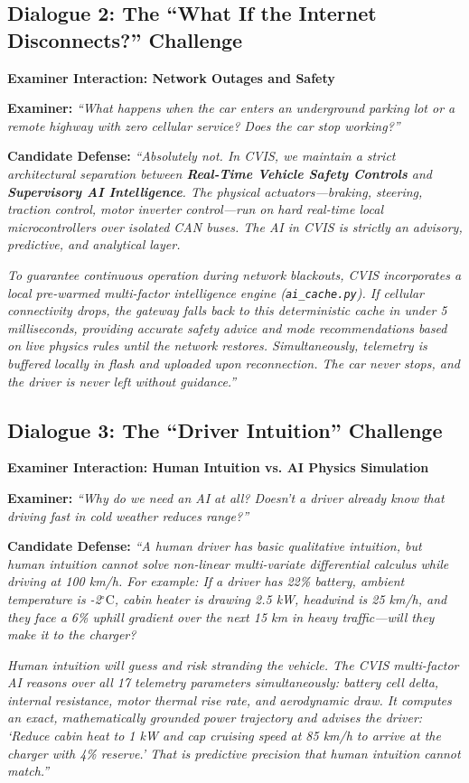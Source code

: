 \documentclass[12pt,a4paper]{report}
\newenvironment{dialoguebox}[1]{%
  \begin{mdframed}[backgroundcolor=cvislightbg,
    linecolor=cvisteal,linewidth=1.5pt,
    innerleftmargin=10pt,innerrightmargin=10pt,
    innertopmargin=6pt,innerbottommargin=6pt]
  \textbf{\color{cvisblue}#1}\par\smallskip}
  {\end{mdframed}}
\begin{document}
\subsection{Dialogue 2: The ``What If the Internet Disconnects?'' Challenge}
\begin{dialoguebox}{Examiner Interaction: Network Outages and Safety}
\textbf{Examiner:} \textit{``What happens when the car enters an underground parking lot or a remote highway with zero cellular service? Does the car stop working?''}

\textbf{Candidate Defense:} 
\textit{``Absolutely not. In CVIS, we maintain a strict architectural separation between \textbf{Real-Time Vehicle Safety Controls} and \textbf{Supervisory AI Intelligence}. The physical actuators---braking, steering, traction control, motor inverter control---run on hard real-time local microcontrollers over isolated CAN buses. The AI in CVIS is strictly an advisory, predictive, and analytical layer.}

\textit{To guarantee continuous operation during network blackouts, CVIS incorporates a local pre-warmed multi-factor intelligence engine (\texttt{ai\_cache.py}). If cellular connectivity drops, the gateway falls back to this deterministic cache in under 5 milliseconds, providing accurate safety advice and mode recommendations based on live physics rules until the network restores. Simultaneously, telemetry is buffered locally in flash and uploaded upon reconnection. The car never stops, and the driver is never left without guidance.''}
\end{dialoguebox}

\subsection{Dialogue 3: The ``Driver Intuition'' Challenge}
\begin{dialoguebox}{Examiner Interaction: Human Intuition vs. AI Physics Simulation}
\textbf{Examiner:} \textit{``Why do we need an AI at all? Doesn't a driver already know that driving fast in cold weather reduces range?''}

\textbf{Candidate Defense:} 
\textit{``A human driver has basic qualitative intuition, but human intuition cannot solve non-linear multi-variate differential calculus while driving at 100 km/h. For example: If a driver has 22\% battery, ambient temperature is -2$^\circ\text{C}$, cabin heater is drawing 2.5 kW, headwind is 25 km/h, and they face a 6\% uphill gradient over the next 15 km in heavy traffic---will they make it to the charger?}

\textit{Human intuition will guess and risk stranding the vehicle. The CVIS multi-factor AI reasons over all 17 telemetry parameters simultaneously: battery cell delta, internal resistance, motor thermal rise rate, and aerodynamic draw. It computes an exact, mathematically grounded power trajectory and advises the driver: `Reduce cabin heat to 1 kW and cap cruising speed at 85 km/h to arrive at the charger with 4\% reserve.' That is predictive precision that human intuition cannot match.''}
\end{dialoguebox}
\end{document}
